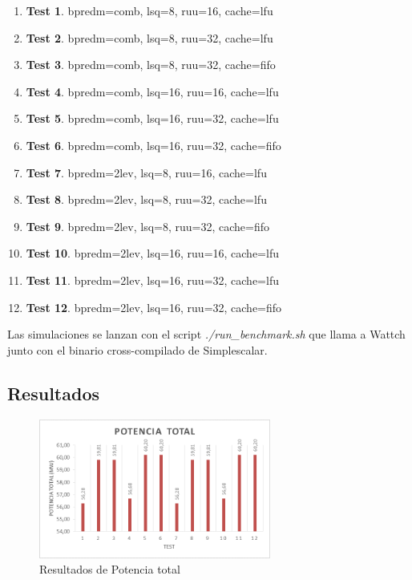 \documentclass[journal]{IEEEtran}
\begin{document}
\begin{enumerate}
\item \textbf{Test 1}.  bpredm=comb, lsq=8, ruu=16, cache=lfu
\item \textbf{Test 2}.  bpredm=comb, lsq=8, ruu=32, cache=lfu
\item \textbf{Test 3}.  bpredm=comb, lsq=8, ruu=32, cache=fifo
\item \textbf{Test 4}.  bpredm=comb, lsq=16, ruu=16, cache=lfu
\item \textbf{Test 5}.  bpredm=comb, lsq=16, ruu=32, cache=lfu
\item \textbf{Test 6}.  bpredm=comb, lsq=16, ruu=32, cache=fifo
\item \textbf{Test 7}.  bpredm=2lev, lsq=8, ruu=16, cache=lfu
\item \textbf{Test 8}.  bpredm=2lev, lsq=8, ruu=32, cache=lfu
\item \textbf{Test 9}.  bpredm=2lev, lsq=8, ruu=32, cache=fifo
\item \textbf{Test 10}. bpredm=2lev, lsq=16, ruu=16, cache=lfu
\item \textbf{Test 11}. bpredm=2lev, lsq=16, ruu=32, cache=lfu
\item \textbf{Test 12}. bpredm=2lev, lsq=16, ruu=32, cache=fifo \newline
\end{enumerate}

Las simulaciones se lanzan con el script \textit{./run\_benchmark.sh} que llama a Wattch junto con el binario cross-compilado de Simplescalar.

\subsection{Resultados}

\begin{figure}[!ht]
        \begin{center}
        \includegraphics[width=3in]{fig1.png}
        \caption{Resultados de Potencia total}
        \end{center}
\end{figure}
\end{document}
